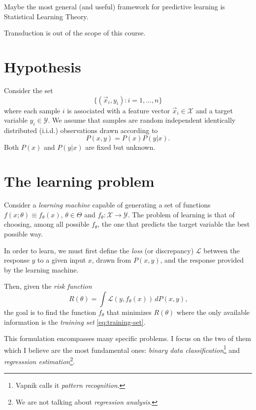 Maybe the most general (and useful) framework for predictive learning is Statistical
Learning Theory.

Transduction is out of the scope of this course.

\section{Hypothesis}

Consider the set
\begin{equation}
  \label{eq:training-set}
  \big\{(\vec{x}_i, y_i) : i = 1, \dots, n \big\}
\end{equation}
where each sample $i$ is associated with a feature vector $\vec{x}_i \in \mathcal{X}$ and a target variable
$y_i \in \mathcal{Y}$.  We assume that samples are random independent identically
distributed (i.i.d.) observations drawn according to $$P(x, y) = P(x) P(y | x)\text{.}$$
Both $P(x)$ and $P(y|x)$ are fixed but unknown.

\section{The learning problem}

Consider a \emph{learning machine} capable of generating a set of functions $f(x;
\theta) \equiv f_\theta(x)$, $\theta \in \Theta$ and $f_\theta : \mathcal{X} \rightarrow \mathcal{Y}$.
The problem of learning is that of choosing, among all possible $f_\theta$, the one that
predicts the target variable the best possible way.

In order to learn, we must first define the \emph{loss} (or discrepancy) $\mathcal{L}$
between the response $y$ to a given input $x$, drawn from $P(x, y)$, and the
response provided by the learning machine.

Then, given the \emph{risk function}
\begin{equation}
  \label{eq:risk}
  R(\theta) = \int \mathcal{L}(y, f_\theta(x))\, dP(x, y)\text{,}
\end{equation}
the goal is to find the function $f_\theta$ that minimizes $R(\theta)$
where the only available information is the \emph{training set} \eqref{eq:training-set}.

This formulation encompasses many specific problems. I focus on the two of them which I
believe are the most fundamental ones: \emph{binary data classification}\footnote{Vapnik
calls it \emph{pattern recognition}.} and \emph{regresssion estimation}\footnote{We are not talking about
\emph{regression analysis}.}.

